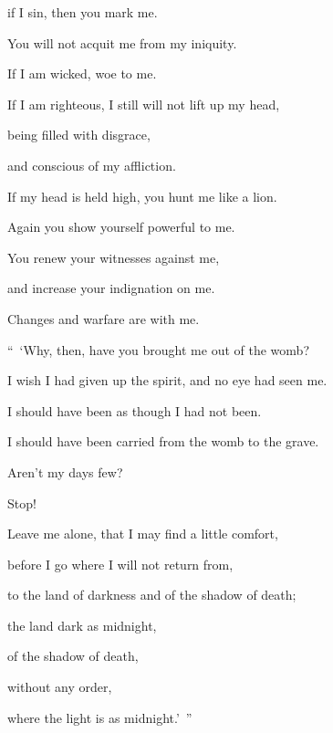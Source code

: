 {\par }{\Q {}if I sin, then you mark me.
\par }{\QB You will not acquit me from my iniquity.
\par }{\Q {}If I am wicked, woe to me.
\par }{\QB If I am righteous, I still will not lift up my head,
\par }{\QB being filled with disgrace,
\par }{\QB and conscious of my affliction.
\par }{\Q {}If my head is held high, you hunt me like a lion.
\par }{\QB Again you show yourself powerful to me.
\par }{\Q {}You renew your witnesses against me,
\par }{\QB and increase your indignation on me.
\par }{\QB Changes and warfare are with me.
\par }{\BB \par }{\Q {}“ ‘Why, then, have you brought me out of the womb?
\par }{\QB I wish I had given up the spirit, and no eye had seen me.
\par }{\Q {}I should have been as though I had not been.
\par }{\QB I should have been carried from the womb to the grave.
\par }{\Q {}Aren’t my days few?
\par }{\QB Stop!
\par }{\Q Leave me alone, that I may find a little comfort,
\par }{\QB {}before I go where I will not return from,
\par }{\QB to the land of darkness and of the shadow of death;
\par }{\Q {}the land dark as midnight,
\par }{\QB of the shadow of death,
\par }{\QB without any order,
\par }{\QB where the light is as midnight.’ ”

}
